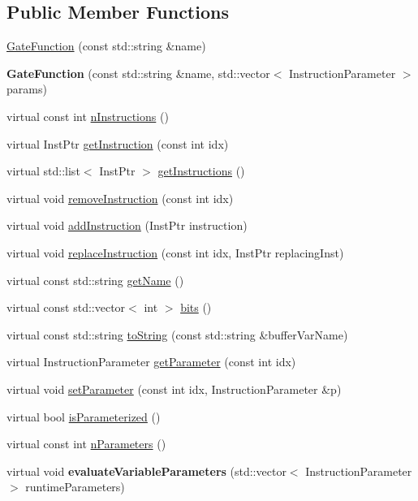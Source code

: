 \subsection*{Public Member Functions}
\begin{DoxyCompactItemize}
\item 
\hyperlink{a00111_a77545e72bd53268f609888654fcd8eee}{Gate\+Function} (const std\+::string \&name)
\item 
{\bfseries Gate\+Function} (const std\+::string \&name, std\+::vector$<$ Instruction\+Parameter $>$ params)\hypertarget{a00111_a0b1b3fb51a5b0f1bcb1b10692ab2e595}{}\label{a00111_a0b1b3fb51a5b0f1bcb1b10692ab2e595}

\item 
virtual const int \hyperlink{a00111_aa70b26156c060fec71316fe5e98bb102}{n\+Instructions} ()
\item 
virtual Inst\+Ptr \hyperlink{a00111_a841d656eed8aa9b4c0eec3f1da38069c}{get\+Instruction} (const int idx)
\item 
virtual std\+::list$<$ Inst\+Ptr $>$ \hyperlink{a00111_aebce6a9e64aed7f4aff86df752bacfe2}{get\+Instructions} ()
\item 
virtual void \hyperlink{a00111_a44ca35d081577de9ad2930f93c01e89d}{remove\+Instruction} (const int idx)
\item 
virtual void \hyperlink{a00111_a892fb69a10f0a7cb5abdab4cca61b80a}{add\+Instruction} (Inst\+Ptr instruction)
\item 
virtual void \hyperlink{a00111_a182fdfabbf546ae89e4f2384bafb45c9}{replace\+Instruction} (const int idx, Inst\+Ptr replacing\+Inst)
\item 
virtual const std\+::string \hyperlink{a00111_af42efb6191267164717d53c469e15d3a}{get\+Name} ()
\item 
virtual const std\+::vector$<$ int $>$ \hyperlink{a00111_aba03de68b76a9e120705c3c389c714a1}{bits} ()
\item 
virtual const std\+::string \hyperlink{a00111_aa1950776ae84bad2d0795a0441f910e7}{to\+String} (const std\+::string \&buffer\+Var\+Name)
\item 
virtual Instruction\+Parameter \hyperlink{a00111_a5991903323e412777bedc4f0c862eb63}{get\+Parameter} (const int idx)
\item 
virtual void \hyperlink{a00111_ab8d9789b46e92e27a9d7c9c5b7e3683c}{set\+Parameter} (const int idx, Instruction\+Parameter \&p)
\item 
virtual bool \hyperlink{a00111_afad47903e0ed55ddbfa827ef8408a94b}{is\+Parameterized} ()
\item 
virtual const int \hyperlink{a00111_ad0bffcbc0884d81d6bdddf55385fc6c9}{n\+Parameters} ()
\item 
virtual void {\bfseries evaluate\+Variable\+Parameters} (std\+::vector$<$ Instruction\+Parameter $>$ runtime\+Parameters)\hypertarget{a00111_a4bcbd2c8c4b615d74e4a4d39952fd411}{}\label{a00111_a4bcbd2c8c4b615d74e4a4d39952fd411}

\end{DoxyCompactItemize}
